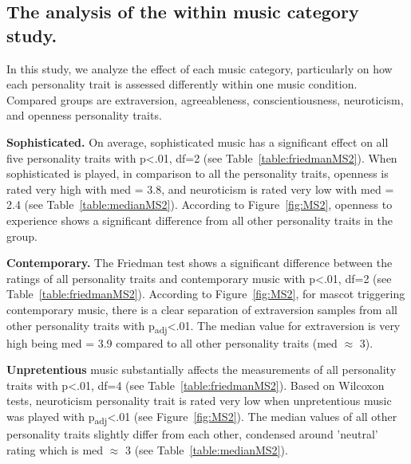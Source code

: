 \subsection{The analysis of the within music category study.}
\label{subsec:MSstudy2}
In this study, we analyze the effect of each music category, particularly on how each personality
trait is assessed differently within one music condition.
Compared groups are extraversion, agreeableness, conscientiousness, neuroticism, and openness personality traits.

\par\textbf{Sophisticated.}
On average, sophisticated music has a significant effect on all five personality traits with
p<.01, df=2 (see Table~\ref{table:friedmanMS2}).
When sophisticated is played, in comparison to all the personality traits,
openness is rated very high with med = 3.8, and neuroticism
is rated very low with med = 2.4 (see Table~\ref{table:medianMS2}).
According to Figure~\ref{fig:MS2}, openness to experience shows a
significant difference from all other personality traits in the group.

\par\textbf{Contemporary.}
The Friedman test shows a significant difference between the ratings of all personality traits and
contemporary music with p<.01, df=2 (see Table~\ref{table:friedmanMS2}).
According to Figure~\ref{fig:MS2}, for mascot triggering contemporary music, there is a clear
separation of extraversion samples from all other personality traits with p\textsubscript{adj}<.01.
The median value for extraversion is very high being med = 3.9 compared to all
other personality traits (med $\approx$ 3).

\par\textbf{Unpretentious}
music substantially affects the measurements of all personality traits with
p<.01, df=4 (see Table~\ref{table:friedmanMS2}).
Based on Wilcoxon tests, neuroticism personality trait is rated very low when unpretentious music
was played with p\textsubscript{adj}<.01 (see Figure~\ref{fig:MS2}).
The median values of all other personality traits slightly differ from each other,
condensed around 'neutral' rating which is med $\approx$ 3 (see Table~\ref{table:medianMS2}).


